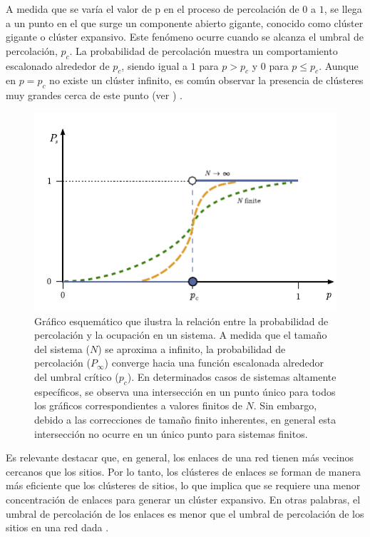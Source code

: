 A medida que se varía el valor de p en el proceso de percolación de $0$ a $1$, se llega a un punto en el que surge un componente abierto gigante, conocido como clúster gigante o clúster expansivo. Este fenómeno ocurre cuando se alcanza el umbral de percolación, $p_c$. La probabilidad de percolación muestra un comportamiento escalonado alrededor de $p_c$, siendo igual a $1$ para $p > p_c$ y 0 para $p \leq p_c$. Aunque en $p = p_c$ no existe un clúster infinito, es común observar la presencia de clústeres muy grandes cerca de este punto (ver ) \cite{aizenman_number_1997}.


 \begin{figure}[h!]
	\centering\includegraphics[width=\imsize]{probabilidad}
	\caption[Gráfico esquemático que ilustra la relación entre la probabilidad de percolación y la ocupación en un sistema]{Gráfico esquemático que ilustra la relación entre la probabilidad de percolación y la ocupación en un sistema. A medida que el tamaño del sistema ($N$) se aproxima a infinito, la probabilidad de percolación ($P_\infty$) converge hacia una función escalonada alrededor del umbral crítico ($p_c$). En determinados casos de sistemas altamente específicos, se observa una intersección en un punto único para todos los gráficos correspondientes a valores finitos de $N$. Sin embargo, debido a las correcciones de tamaño finito inherentes, en general esta intersección no ocurre en un único punto para sistemas finitos.}\label{fig:probabilidadinf}
\end{figure}

Es relevante destacar que, en general, los enlaces de una red tienen más vecinos cercanos que los sitios. Por lo tanto, los clústeres de enlaces se forman de manera más eficiente que los clústeres de sitios, lo que implica que se requiere una menor concentración de enlaces para generar un clúster expansivo. En otras palabras, el umbral de percolación de los enlaces es menor que el umbral de percolación de los sitios en una red dada \cite{bunde_fractals_2012}.



